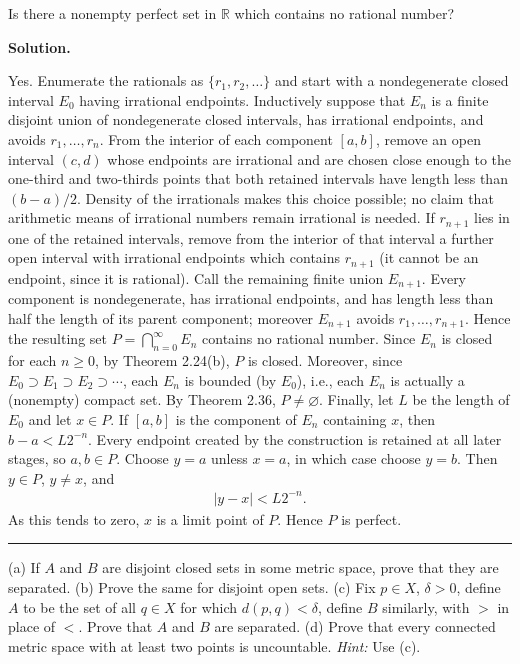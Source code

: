 \documentclass[12pt]{article}
\theoremstyle{definition}
\begin{document}
Is there a nonempty perfect set in $\mathbb{R}$ which contains no rational number?

\smallskip
\noindent\textbf{Solution.}\quad

Yes. Enumerate the rationals as $\{r_1,r_2,\ldots\}$ and start
with a nondegenerate closed interval $E_0$ having irrational endpoints.
Inductively suppose that $E_n$ is a finite disjoint union of nondegenerate
closed intervals, has irrational endpoints, and avoids
$r_1,\ldots,r_n$.  From the interior of each component $[a,b]$, remove
an open interval $(c,d)$ whose endpoints are irrational and are chosen
close enough to the one-third and two-thirds points that both retained
intervals have length less than $(b-a)/2$.  Density of the irrationals
makes this choice possible; no claim that arithmetic means of irrational
numbers remain irrational is needed.  If $r_{n+1}$ lies in one of the
retained intervals, remove from the interior of that interval a further
open interval with irrational endpoints which contains $r_{n+1}$ (it
cannot be an endpoint, since it is rational).  Call the remaining finite
union $E_{n+1}$.  Every component is nondegenerate, has irrational
endpoints, and has length less than half the length of its parent
component; moreover $E_{n+1}$ avoids $r_1,\ldots,r_{n+1}$.  Hence the resulting set
$P=\bigcap_{n=0}^\infty E_n$ contains no rational number.
Since $E_n$ is closed for each $n\ge 0$, by Theorem 2.24(b), $P$ is closed. Moreover, since $E_0\supset E_1\supset E_2\supset \cdots$, each $E_n$ is bounded (by $E_0$), i.e., each $E_n$ is actually a (nonempty) compact set. By Theorem 2.36, $P\ne\varnothing$. Finally, let $L$ be the length of $E_0$ and let $x\in P$.  If $[a,b]$ is the component of $E_n$ containing $x$, then $b-a<L2^{-n}$.  Every endpoint created by the construction is retained at all later stages, so $a,b\in P$.  Choose $y=a$ unless $x=a$, in which case choose $y=b$.  Then $y\in P$, $y\ne x$, and
\begin{align*}
\left\vert y-x\right\vert<L2^{-n}.
\end{align*}
As this tends to zero, $x$ is a limit point of $P$.  Hence $P$ is perfect.



\bigskip\noindent\hrule\bigskip

(a) If $A$ and $B$ are disjoint closed sets in some metric space, prove that they are separated.
(b) Prove the same for disjoint open sets.
(c) Fix $p\in X$, $\delta>0$, define $A$ to be the set of all $q\in X$ for which $d(p,q)<\delta$, define $B$ similarly, with $>$ in place of $<$. Prove that $A$ and $B$ are separated.
(d) Prove that every connected metric space with at least two points is uncountable. \textit{Hint:} Use (c).
\end{document}
